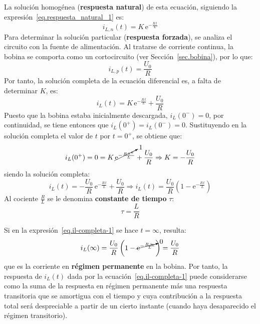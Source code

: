 \documentclass[11pt]{book} %
\numberwithin{dummy}{section}
\theoremstyle{ocrenumbox}
\theoremstyle{blacknumex}
\theoremstyle{blacknumbox}
\theoremstyle{ocrenum}
\newlength\esp
\begin{document}
	La solución homogénea (\textbf{respuesta natural}) de esta ecuación, siguiendo la expresión~\eqref{eq.respuesta_natural_1} es:
	\begin{equation}
	    \boxed{i_{L,n}(t)=K\,\mathrm{e}^{-\frac{R\,t}{L}}}
	\end{equation}
	Para determinar la solución particular (\textbf{respuesta forzada}), se analiza el circuito con la fuente de alimentación. Al tratarse de corriente continua, la bobina se comporta como un cortocircuito (ver Sección~\ref{sec.bobina}), por lo que:
	\begin{equation}
	    \boxed{i_{L,p}(t)=\dfrac{U_0}{R}}
	\end{equation}
	Por tanto, la solución completa de la ecuación diferencial es, a falta de determinar $K$, es:
	\begin{equation}\label{eq.il-completa-1-sinK}
	    i_L(t)=K\,\mathrm{e}^{-\frac{R\,t}{L}}+\dfrac{U_0}{R}
	\end{equation}
	Puesto que la bobina estaba inicialmente descargada,  $i_L(0^-)=0$, por continuidad, se tiene entonces que $i_L(0^+)=i_L(0^-)=0$. Sustituyendo en la solución completa el valor de $t$ por $t=0^+$, se obtiene que:
	\begin{equation*}
	    i_L(0^+)=0=K\,\cancelto{1}{\mathrm{e}^{-\frac{R\,0^+}{L}}}+\dfrac{U_0}{R}\Rightarrow K=-\dfrac{U_0}{R}
	\end{equation*}
	siendo la solución completa:
	\begin{equation}\label{eq.il-completa-1}
	    i_L(t)=-\dfrac{U_0}{R}\,\mathrm{e}^{-\frac{R\,t}{L}}+\dfrac{U_0}{R} \Rightarrow \boxed{i_L(t) =\dfrac{U_0}{R}\left(1- \mathrm{e}^{-\frac{R\,t}{L}}\right)}
	\end{equation}
	Al cociente $\frac{R}{L}$ se le denomina \textbf{constante de tiempo} $\tau$:
	\begin{equation}
	    \boxed{\tau=\dfrac{L}{R}}
	\end{equation}
	
	Si en la expresión~\eqref{eq.il-completa-1} se hace $t=\infty$, resulta:
	\begin{equation*}
	    i_L(\infty) =\dfrac{U_0}{R}\left(1- \cancelto{0}{\mathrm{e}^{-\frac{R\,\infty}{L}}}\right)=\dfrac{U_0}{R}
	\end{equation*}
	que es la corriente en \textbf{régimen permanente} en la bobina. Por tanto, la respuesta de $i_L(t)$ dada por la ecuación~\eqref{eq.il-completa-1} puede considerarse como la suma de la respuesta en régimen permanente más una respuesta transitoria que se amortigua con el tiempo y cuya contribución a la respuesta total será despreciable a partir de un cierto instante (cuando haya desaparecido el régimen transitorio). 
	
\end{document}
